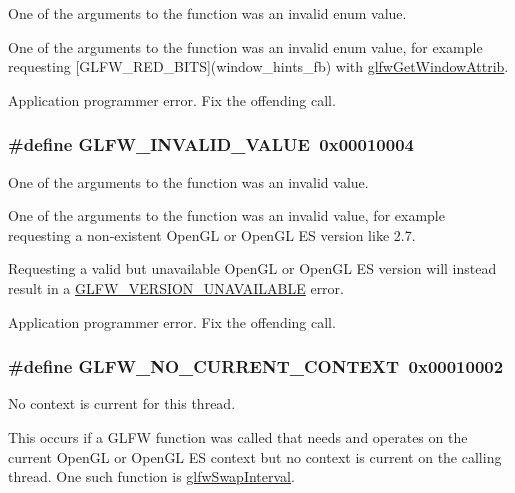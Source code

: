 One of the arguments to the function was an invalid enum value. 

One of the arguments to the function was an invalid enum value, for example requesting \mbox{[}GLFW\_\-RED\_\-BITS\mbox{]}(window\_\-hints\_\-fb) with \hyperlink{group__window_g1bb0c7e100418e284dbb800789c63d40}{glfwGetWindowAttrib}.

Application programmer error. Fix the offending call. \hypertarget{group__errors_gaf2ef9aa8202c2b82ac2d921e554c687}{
\subsubsection[GLFW\_\-INVALID\_\-VALUE]{\setlength{\rightskip}{0pt plus 5cm}\#define GLFW\_\-INVALID\_\-VALUE~0x00010004}}
\label{group__errors_gaf2ef9aa8202c2b82ac2d921e554c687}


One of the arguments to the function was an invalid value. 

One of the arguments to the function was an invalid value, for example requesting a non-existent OpenGL or OpenGL ES version like 2.7.

Requesting a valid but unavailable OpenGL or OpenGL ES version will instead result in a \hyperlink{group__errors_gd16c5565b4a69f9c2a9ac2c0dbc89462}{GLFW\_\-VERSION\_\-UNAVAILABLE} error.

Application programmer error. Fix the offending call. \hypertarget{group__errors_ga8290386e9528ccb9e42a3a4e16fc0d0}{
\subsubsection[GLFW\_\-NO\_\-CURRENT\_\-CONTEXT]{\setlength{\rightskip}{0pt plus 5cm}\#define GLFW\_\-NO\_\-CURRENT\_\-CONTEXT~0x00010002}}
\label{group__errors_ga8290386e9528ccb9e42a3a4e16fc0d0}


No context is current for this thread. 

This occurs if a GLFW function was called that needs and operates on the current OpenGL or OpenGL ES context but no context is current on the calling thread. One such function is \hyperlink{group__context_g12a595c06947cec4967c6e1f14210a8a}{glfwSwapInterval}.

